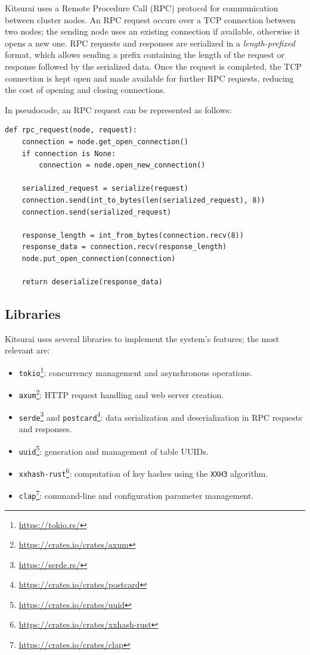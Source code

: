 Kitsurai uses a Remote Procedure Call (RPC) protocol for communication between cluster nodes.
An RPC request occurs over a TCP connection between two nodes; the sending node uses an existing connection if available, otherwise it opens a new one.
RPC requests and responses are serialized in a \emph{length-prefixed} format, which allows sending a prefix containing the length of the request or response followed by the serialized data.
Once the request is completed, the TCP connection is kept open and made available for further RPC requests, reducing the cost of opening and closing connections.

In pseudocode, an RPC request can be represented as follows:
\begin{verbatim}
def rpc_request(node, request):
    connection = node.get_open_connection()
    if connection is None:
        connection = node.open_new_connection()

    serialized_request = serialize(request)
    connection.send(int_to_bytes(len(serialized_request), 8))
    connection.send(serialized_request)

    response_length = int_from_bytes(connection.recv(8))
    response_data = connection.recv(response_length)
    node.put_open_connection(connection)

    return deserialize(response_data)
\end{verbatim}

\subsection{Libraries}
\label{subsec:libraries}

Kitsurai uses several libraries to implement the system's features; the most relevant are:
\begin{itemize}
    \item \texttt{tokio}\footnote{\url{https://tokio.rs/}}: concurrency management and asynchronous operations.
    \item \texttt{axum}\footnote{\url{https://crates.io/crates/axum}}: HTTP request handling and web server creation.
    \item \texttt{serde}\footnote{\url{https://serde.rs/}} and \texttt{postcard}\footnote{\url{https://crates.io/crates/postcard}}: data serialization and deserialization in RPC requests and responses.
    \item \texttt{uuid}\footnote{\url{https://crates.io/crates/uuid}}: generation and management of table UUIDs.
    \item \texttt{xxhash-rust}\footnote{\url{https://crates.io/crates/xxhash-rust}}: computation of key hashes using the \texttt{XXH3} algorithm.
    \item \texttt{clap}\footnote{\url{https://crates.io/crates/clap}}: command-line and configuration parameter management.
\end{itemize}

